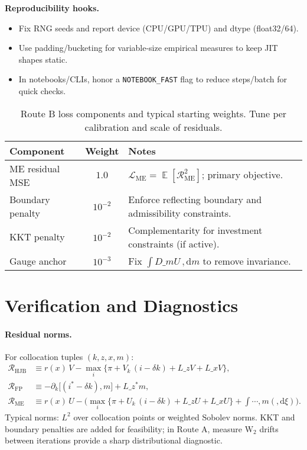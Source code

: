 ﻿\documentclass[11pt,letterpaper,oneside]{article}
\numberwithin{equation}{section}
\DeclareMathOperator{\E}{\mathbb{E}}
\newcommand{\1}{\mathbf{1}}
\newcommand{\diff}{,\mathrm{d}}
\newcommand{\Lz}{L\_z}
\newcommand{\Lx}{L\_x}
\newcommand{\Lzadj}{L\_z^{\!*}}
\newcommand{\dmU}{D\_m U}
\newcommand{\dxi}{, m(\diff \xi)}
\begin{document}
\begin{tcolorbox}[didacticstyle]
\textbf{Reproducibility hooks.}
\begin{itemize}[leftmargin=1.1em,itemsep=0.25em]
  \item Fix RNG seeds and report device (CPU/GPU/TPU) and dtype (float32/64).
  \item Use padding/bucketing for variable-size empirical measures to keep JIT shapes static.
  \item In notebooks/CLIs, honor a \texttt{NOTEBOOK\_FAST} flag to reduce steps/batch for quick checks.
\end{itemize}
\end{tcolorbox}

\begin{table}[ht]
\centering
\small
\begin{tabular}{@{}lcl@{}}
\toprule
Component & Weight & Notes \\
\midrule
ME residual MSE & $1.0$ & $\mathcal{L}_{\mathrm{ME}}=\E[\mathcal{R}_{\mathrm{ME}}^2]$; primary objective. \\
Boundary penalty & $10^{-2}$ & Enforce reflecting boundary and admissibility constraints. \\
KKT penalty & $10^{-2}$ & Complementarity for investment constraints (if active). \\
Gauge anchor & $10^{-3}$ & Fix $\int \dmU\,\diff m$ to remove invariance. \\
\bottomrule
\end{tabular}
\caption{Route B loss components and typical starting weights. Tune per calibration and scale of residuals.}
\end{table}

\section{Verification and Diagnostics}\label{sec:verification}

\paragraph{Residual norms.}
For collocation tuples $(k,z,x,m)$:
\begin{align*}
\mathcal{R}_{\mathrm{HJB}} &\equiv r(x)\, V - \max_{i}\{\pi + V_k\,(i-\delta k) + \Lz V + \Lx V\},\\
\mathcal{R}_{\mathrm{FP}}  &\equiv -\partial_k\big[(i^*-\delta k),m\big] + \Lzadj m,\\
\mathcal{R}_{\mathrm{ME}}  &\equiv r(x)\,U - \Big(\max_{i}\{\pi + U_k\,(i-\delta k) + \Lz U + \Lx U\}
  + \int\cdots\dxi
  \Big).
\end{align*}
  Typical norms: $L^2$ over collocation points or weighted Sobolev norms. KKT and boundary penalties are added for feasibility; in Route A, measure $\mathrm{W}_2$ drifts between iterations provide a sharp distributional diagnostic.
\end{document}
